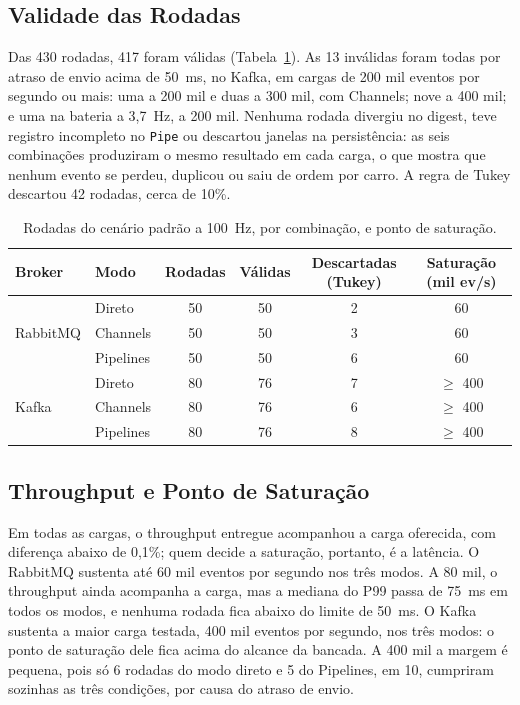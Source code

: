 \documentclass[12pt]{article}
\begin{document}
\subsection{Validade das Rodadas}

Das 430 rodadas, 417 foram válidas (Tabela~\ref{tab:validade}). As 13
inválidas foram todas por atraso de envio acima de 50~ms, no Kafka, em cargas
de 200 mil eventos por segundo ou mais: uma a 200 mil e duas a 300 mil, com
Channels; nove a 400 mil; e uma na bateria a 3,7~Hz, a 200 mil. Nenhuma rodada
divergiu no digest, teve registro incompleto no \texttt{Pipe} ou descartou
janelas na persistência: as seis combinações produziram o mesmo resultado em
cada carga, o que mostra que nenhum evento se perdeu, duplicou ou saiu de ordem
por carro. A regra de Tukey descartou 42 rodadas, cerca de 10\%.

\begin{table}[ht]
\centering
\caption{Rodadas do cenário padrão a 100~Hz, por combinação, e ponto de saturação.}
\label{tab:validade}
\small
\begin{tabular}{|l|l|c|c|c|c|}
\hline
\textbf{Broker} & \textbf{Modo} & \textbf{Rodadas} & \textbf{Válidas} & \textbf{Descartadas (Tukey)} & \textbf{Saturação (mil ev/s)} \\
\hline
\multirow{3}{*}{RabbitMQ} & Direto & 50 & 50 & 2 & 60 \\
 & Channels & 50 & 50 & 3 & 60 \\
 & Pipelines & 50 & 50 & 6 & 60 \\
\hline
\multirow{3}{*}{Kafka} & Direto & 80 & 76 & 7 & $\geq$ 400 \\
 & Channels & 80 & 76 & 6 & $\geq$ 400 \\
 & Pipelines & 80 & 76 & 8 & $\geq$ 400 \\
\hline
\end{tabular}
\end{table}

\subsection{Throughput e Ponto de Saturação}

Em todas as cargas, o throughput entregue acompanhou a carga oferecida, com
diferença abaixo de 0,1\%; quem decide a saturação, portanto, é a latência. O
RabbitMQ sustenta até 60 mil eventos por segundo nos três modos. A 80 mil, o
throughput ainda acompanha a carga, mas a mediana do P99 passa de 75~ms em
todos os modos, e nenhuma rodada fica abaixo do limite de 50~ms. O Kafka
sustenta a maior carga testada, 400 mil eventos por segundo, nos três modos: o
ponto de saturação dele fica acima do alcance da bancada. A 400 mil a margem é
pequena, pois só 6 rodadas do modo direto e 5 do Pipelines, em 10, cumpriram
sozinhas as três condições, por causa do atraso de envio.
\end{document}

